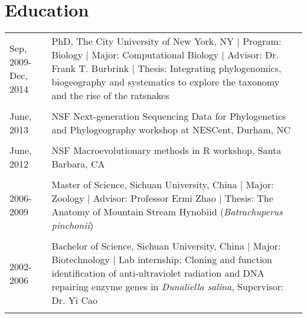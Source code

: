 \documentclass[12pt]{article}
\begin{document}
\section{Education}
\begin{tabular}{lp{12cm}}	
Sep, 2009-Dec, 2014 & PhD, The City University of New York, NY | Program: Biology | Major: Computational Biology | Advisor: Dr. Frank T. Burbrink | Thesis: Integrating phylogenomics, biogeography and systematics to explore the taxonomy and the rise of the ratsnakes\\\multicolumn{2}{c}{} \\
June, 2013& NSF Next-generation Sequencing Data for Phylogenetics and Phylogeography workshop at NESCent, Durham, NC\\\multicolumn{2}{c}{} \\
June, 2012& NSF Macroevolutionary methods in R workshop, Santa Barbara, CA\\\multicolumn{2}{c}{} \\
2006-2009&Master of Science, Sichuan University, China | Major: Zoology | Advisor: Professor Ermi Zhao | Thesis: The Anatomy of Mountain Stream Hynobiid (\textit{Batrachuperus pinchonii})\\\multicolumn{2}{c}{} \\
2002-2006&Bachelor of Science, Sichuan University, China | Major: Biotechnology | Lab internship: Cloning and function identification of anti-ultraviolet radiation and DNA repairing enzyme genes in \textit{Dunaliella salina}, Supervisor: Dr. Yi Cao  \\ \multicolumn{2}{c}{} \\
\end{tabular}
\\ 
 
\end{document}
